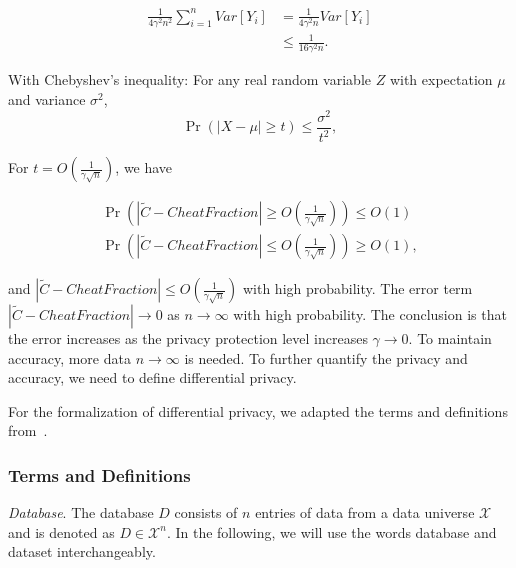 \begin{equation}
    \begin{split}
        \frac{1}{4\gamma^{2}n^{2}}\sum ^{n}_{i=1}Var\left[ Y_{i}\right] &= \frac{1}{4\gamma^{2}n} Var\left[ Y_{i}\right] \\
        & \leq \frac{1}{16\gamma^{2}n}.
    \end{split}
\end{equation}


With Chebyshev's inequality: For any real random variable $Z$ with expectation $\mu$ and variance $\sigma^{2}$,
\begin{equation}
    \Pr( \left| X-\mu\right| \geq  t) \leq \frac{\sigma^{2}}{t^{2}},
\end{equation}

For $t=O\left(\frac{1}{\gamma\sqrt{n}}\right) $, we have

\begin{equation}
    \begin{split}
        \Pr \left(\left| \tilde{C}-CheatFraction\right| \geq O\left( \frac{1}{\gamma\sqrt{n}}\right)\right) \leq O\left(1\right) \\
        \Pr \left(\left| \tilde{C}-CheatFraction\right| \leq O\left( \frac{1}{\gamma\sqrt{n}}\right)\right) \geq O\left(1\right) ,
    \end{split}
\end{equation}

and $\left| \tilde{C}-CheatFraction\right| \leq O\left( \frac{1}{\gamma\sqrt{n}}\right)$ with high probability.
The error term $\left| \tilde{C}-CheatFraction\right| \to 0$ as $n \to \infty$ with high probability.
The conclusion is that the error increases as the privacy protection level increases $\gamma \to 0$. To maintain accuracy, more data $n \to \infty$ is needed. To further quantify the privacy and accuracy, we need to define differential privacy.



For the formalization of differential privacy, we adapted the terms and definitions from~\cite{dwork2014algorithmic}.

\subsubsection{Terms and Definitions}

\emph{Database}. The database $D$ consists of $n$ entries of data from a data universe $\mathcal{X}$ and is denoted as $D\in \mathcal{X}^{n}$. In the following, we will use the words database and dataset interchangeably.

